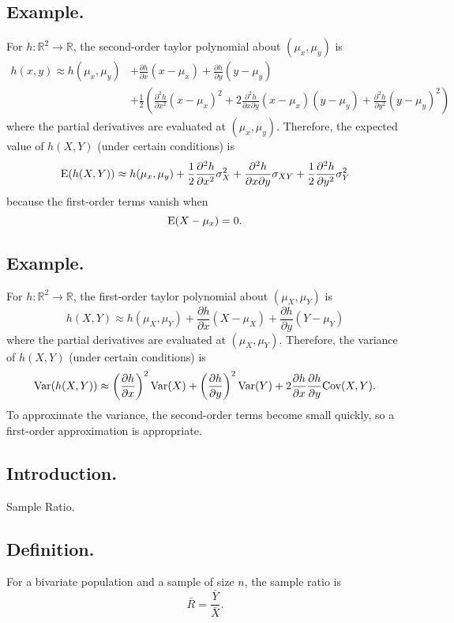 \documentclass[titlepage]{article}
\begin{document}
\subsection{Example.} For $h: \mathbb{R}^{2} \to \mathbb{R}$, the second-order taylor polynomial about $(\mu_{x}, \mu_{y})$ is
\begin{align*}
    h(x, y) \approx h(\mu_{x}, \mu_{y}) &+ \frac{\partial h}{\partial x}(x - \mu_{x}) + \frac{\partial h}{\partial y}(y - \mu_{y}) \\
                                        &+ \frac{1}{2}\left(\frac{\partial^{2} h}{\partial x^{2}}(x - \mu_{x})^{2} + 2\frac{\partial^{2} h}{\partial x \partial y}(x - \mu_{x})(y - \mu_{y}) + \frac{\partial^{2} h}{\partial y^{2}}(y - \mu_{y})^{2}\right)
\end{align*}
where the partial derivatives are evaluated at $(\mu_{x}, \mu_{y})$. Therefore, the expected value of $h(X, Y)$ (under certain conditions) is 
$$\text{E}(h(X, Y)) \approx h(\mu_{x}, \mu_{y}) + \frac{1}{2}\frac{\partial^{2} h}{\partial x^{2}}\sigma_{X}^{2} + \frac{\partial^{2} h}{\partial x \partial y}\sigma_{XY} + \frac{1}{2}\frac{\partial^{2} h}{\partial y^{2}}\sigma_{Y}^{2}$$
because the first-order terms vanish when 
$$\text{E}(X - \mu_{x}) = 0.$$

\subsection{Example.} For $h: \mathbb{R}^{2} \to \mathbb{R}$, the first-order taylor polynomial about $(\mu_{X}, \mu_{Y})$ is
$$h(X, Y) \approx h(\mu_{X}, \mu_{Y}) + \frac{\partial h}{\partial x}(X - \mu_{X}) + \frac{\partial h}{\partial y}(Y - \mu_{Y})$$
where the partial derivatives are evaluated at $(\mu_{X}, \mu_{Y})$. Therefore, the variance of $h(X, Y)$ (under certain conditions) is 
$$\text{Var}(h(X, Y)) \approx \left(\frac{\partial h}{\partial x}\right)^{2}\text{Var}(X) + \left(\frac{\partial h}{\partial y}\right)^{2}\text{Var}(Y) + 2\frac{\partial h}{\partial x}\frac{\partial h}{\partial y}\text{Cov}(X, Y).$$
To approximate the variance, the second-order terms become small quickly, so a first-order approximation is appropriate.

\newpage {}

\subsection{Introduction.} Sample Ratio.

\subsection{Definition.} For a bivariate population and a sample of size $n$, the sample ratio is 
$$\bar{R} = \frac{\bar{Y}}{\bar{X}}.$$
\end{document}
